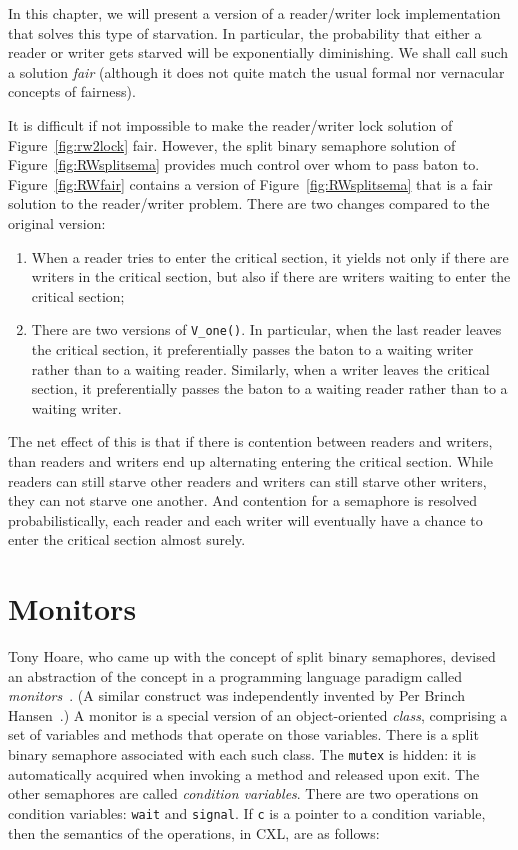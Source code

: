 \documentclass{report}
\begin{document}
In this chapter, we will present a version of a reader/writer lock
implementation that solves this type of starvation.
In particular, the probability that either a reader or writer gets starved
will be exponentially diminishing.
We shall call such a solution \emph{fair}
(although it does not quite
match the usual formal nor vernacular concepts of fairness).

It is difficult if not impossible to make the reader/writer lock solution of
Figure~\ref{fig:rw2lock} fair.  However, the split binary semaphore solution of
Figure~\ref{fig:RWsplitsema} provides much control over whom to pass baton
to.
Figure~\ref{fig:RWfair} contains a version of Figure~\ref{fig:RWsplitsema}
that is a fair solution to the reader/writer problem.  There are two changes
compared to the original version:

\begin{enumerate}
\item When a reader tries to enter the critical section, it yields not only
if there are writers in the critical section, but also if there are writers
waiting to enter the critical section;
\item There are two versions of \texttt{V\_one()}.  In particular, when the
last reader leaves the critical section, it preferentially passes the baton
to a waiting writer rather than to a waiting reader.  Similarly,
when a writer leaves the critical section, it preferentially passes
the baton to a waiting reader rather than to a waiting writer.
\end{enumerate}

The net effect of this is that if there is contention between readers and
writers, than readers and writers end up alternating entering the critical
section.  While readers can still starve other readers and writers can still
starve other writers, they can not starve one another.  And contention for
a semaphore is resolved probabilistically, each reader and each writer will
eventually have a chance to enter the critical section almost surely.

\chapter{Monitors}
\label{ch:monitors}

Tony Hoare, who came up with the concept of split binary semaphores, devised
an abstraction of the concept in a programming language paradigm called
\emph{monitors}~\cite{Hoare74}.
(A similar construct was independently invented by Per Brinch Hansen~\cite{BH73}.)
A monitor is a special version of an object-oriented \emph{class}, comprising
a set of variables and methods that operate on those variables.
There is a split binary semaphore associated with each such class.
The \texttt{mutex} is hidden: it is automatically acquired when invoking a
method and released upon exit.
The other semaphores are called \emph{condition variables}.
There are two operations on condition variables: \texttt{wait}
and
\texttt{signal}.
If \texttt{c} is a pointer to a condition variable, then the semantics of the
operations, in CXL, are as follows:
\end{document}
